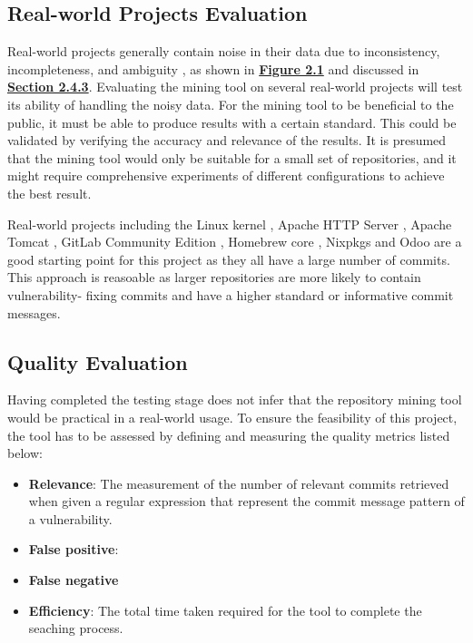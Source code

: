 \documentclass[12pt, a4paper]{report}
\begin{document}
\subsection{Real-world Projects Evaluation} \label{sec:realworld}
Real-world projects generally contain noise in their data due to inconsistency, incompleteness, and
ambiguity \cite{alqahtani_2016}, as shown in \hyperref[figure:comparion_vfc]{\textbf{Figure 2.1}}
and discussed in \hyperref[subsec:finding_vuln]{\textbf{Section 2.4.3}}. Evaluating the mining tool
on several real-world projects will test its ability of handling the noisy data. For the mining tool
to be beneficial to the public, it must be able to produce results with a certain standard. This
could be validated by verifying the accuracy and relevance of the results. It is presumed that the
mining tool would only be suitable for a small set of repositories, and it might require
comprehensive experiments of different configurations to achieve the best result.

Real-world projects including the Linux kernel \cite{linux_repo}, Apache HTTP Server
\cite{apache_httpd_repo}, Apache Tomcat \cite{apache_tomcat_repo}, GitLab Community Edition
\cite{gitlab_repo}, Homebrew core \cite{homebrew_core_repo}, Nixpkgs \cite{nix_packages_repo} and
Odoo \cite{odoo_repo} are a good starting point for this project as they all have a large number of
commits. This approach is reasoable as larger repositories are more likely to contain vulnerability-
fixing commits and have a higher standard or informative commit messages.

\subsection{Quality Evaluation}
Having completed the testing stage does not infer that the repository mining tool would be practical
in a real-world usage. To ensure the feasibility of this project, the tool has to be assessed by
defining and measuring the quality metrics listed below:

\begin{itemize}
	\item \textbf{Relevance}: The measurement of the number of relevant commits retrieved when given a
  regular expression that represent the commit message pattern of a vulnerability.
  \item \textbf{False positive}:
  \item \textbf{False negative}
  \item \textbf{Efficiency}: The total time taken required for the tool to complete the seaching
  process.
\end{itemize}
\end{document}
